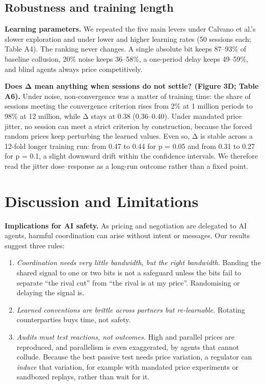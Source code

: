 \documentclass[11pt,a4paper]{article}
\providecommand{\tightlist}{\setlength{\itemsep}{1pt}\setlength{\parskip}{0pt}}
\begin{document}
\hypertarget{robustness-and-training-length}{%
\subsection{Robustness and training length}\label{robustness-and-training-length}}

\textbf{Learning parameters.} We repeated the five main levers under Calvano et al.'s slower exploration and under lower and higher learning rates (50 sessions each; Table A4). The ranking never changes. A single absolute bit keeps 87--93\% of baseline collusion, 20\% noise keeps 36--58\%, a one-period delay keeps 49--59\%, and blind agents always price competitively.

\textbf{Does Δ mean anything when sessions do not settle? (Figure 3D; Table A6).} Under noise, non-convergence was a matter of training time: the share of sessions meeting the convergence criterion rises from 2\% at 1 million periods to 98\% at 12 million, while Δ stays at 0.38 (0.36--0.40). Under mandated price jitter, no session can meet a strict criterion by construction, because the forced random prices keep perturbing the learned values. Even so, Δ is stable across a 12-fold longer training run: from 0.47 to 0.44 for p = 0.05 and from 0.31 to 0.27 for p = 0.1, a slight downward drift within the confidence intervals. We therefore read the jitter dose--response as a long-run outcome rather than a fixed point.

\hypertarget{discussion-and-limitations}{%
\section{Discussion and Limitations}\label{discussion-and-limitations}}

\textbf{Implications for AI safety.} As pricing and negotiation are delegated to AI agents, harmful coordination can arise without intent or messages. Our results suggest three rules:

\begin{enumerate}
\def\labelenumi{\arabic{enumi}.}
\tightlist
\item
  \emph{Coordination needs very little bandwidth, but the right bandwidth.} Banding the shared signal to one or two bits is not a safeguard unless the bits fail to separate ``the rival cut'' from ``the rival is at my price''. Randomising or delaying the signal is.
\item
  \emph{Learned conventions are brittle across partners but re-learnable.} Rotating counterparties buys time, not safety.
\item
  \emph{Audits must test reactions, not outcomes.} High and parallel prices are reproduced, and parallelism is even exaggerated, by agents that cannot collude. Because the best passive test needs price variation, a regulator can \emph{induce} that variation, for example with mandated price experiments or sandboxed replays, rather than wait for it.
\end{enumerate}
\end{document}
